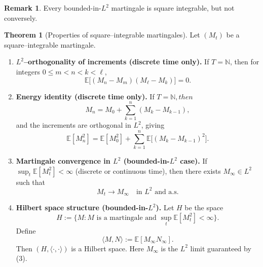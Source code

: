 \documentclass[11pt,a4paper]{article}
\theoremstyle{definition}
\newtheorem{theorem}{Theorem}[section]
\newtheorem{remark}{Remark}[section]
\begin{document}
\begin{remark}
Every bounded-in-$L^2$ martingale is square integrable, but not conversely.
\end{remark}

\begin{theorem}[Properties of square--integrable martingales]
Let $(M_t)$ be a square--integrable martingale.
\begin{enumerate}

\item[\textnormal{(1)}] \textbf{$L^2$--orthogonality of increments  
(discrete time only).}  
If $T=\mathbb{N}$, then for integers $0 \le m<n<k<\ell$,
\[
\mathbb{E}\big[(M_n-M_m)(M_\ell-M_k)\big]=0.
\]

\item[\textnormal{(2)}] \textbf{Energy identity (discrete time only).}  
If $T=\mathbb{N}$$, then$
\[
M_n = M_0 + \sum_{k=1}^n (M_k - M_{k-1}),
\]
and the increments are orthogonal in $L^2$, giving
\[
\mathbb{E}[M_n^2]
= \mathbb{E}[M_0^2] + \sum_{k=1}^n \mathbb{E}\big[(M_k-M_{k-1})^2\big].
\]


\item[\textnormal{(3)}] \textbf{Martingale convergence in $L^2$  
(bounded-in-$L^2$ case).}  
If $\sup_t \mathbb{E}[M_t^2] < \infty$ (discrete or continuous time),
then there exists $M_\infty \in L^2$ such that
\[
M_t \longrightarrow M_\infty \quad \text{in } L^2 \text{ and a.s.}
\]

\item[\textnormal{(4)}] \textbf{Hilbert space structure (bounded-in-$L^2$).}  
Let $H$ be the space
\[
H := \{ M : M \text{ is a martingale and } \sup_t \mathbb{E}[M_t^2]<\infty\}.
\]
Define
\[
\langle M,N\rangle := \mathbb{E}[M_\infty N_\infty].
\]
Then $(H,\langle\cdot,\cdot\rangle)$ is a Hilbert space.
Here $M_\infty$ is the $L^2$ limit guaranteed by (3).

\end{enumerate}
\end{theorem}
\end{document}
